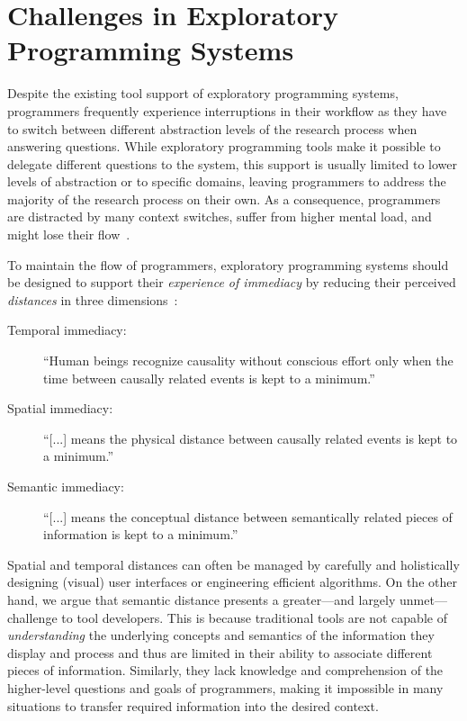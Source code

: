 
\section{Challenges in Exploratory Programming Systems}
\label{sec:background/challenges}

Despite the existing tool support of exploratory programming systems, programmers frequently experience interruptions in their workflow as they have to switch between different abstraction levels of the research process when answering questions.
While exploratory programming tools make it possible to delegate different questions to the system, this support is usually limited to lower levels of abstraction or to specific domains, leaving programmers to address the majority of the research process on their own.
As a consequence, programmers are distracted by many context switches, suffer from higher mental load, and might lose their flow~\cite{csikszentmihalyi2008flow}.

To maintain the flow of programmers, exploratory programming systems should be designed to support their \emph{experience of immediacy} by reducing their perceived \emph{distances} in three dimensions~\cite{ungar1997debugging}:

\begin{description}
	\item[Temporal immediacy:] ``Human beings recognize causality without conscious effort only when the time between causally related events is kept to a minimum.''
	\item[Spatial immediacy:] ``[...] means the physical distance between causally related events is kept to a minimum.''
	\item[Semantic immediacy:] ``[...] means the conceptual distance between semantically related pieces of information is kept to a minimum.''
\end{description}

\noindent
Spatial and temporal distances can often be managed by carefully and holistically designing (visual) user interfaces or engineering efficient algorithms.
On the other hand, we argue that semantic distance presents a greater---and largely unmet---challenge to tool developers.
This is because traditional tools are not capable of \emph{understanding} the underlying concepts and semantics of the information they display and process and thus are limited in their ability to associate different pieces of information.
Similarly, they lack knowledge and comprehension of the higher-level questions and goals of programmers, making it impossible in many situations to transfer required information into the desired context.

